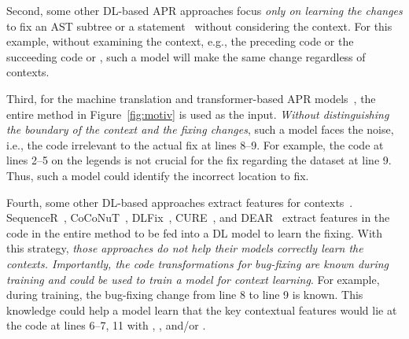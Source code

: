 Second, some other DL-based APR approaches focus {\em only
  on learning the changes} to fix an AST subtree or a
statement~\cite{chakrabortycodit,see2017get} without considering the
context. For this example, without examining the context,
e.g., the preceding code  or the succeeding code
 or ,
such a model will make the same change regardless of contexts.



Third, for the machine translation and transformer-based APR
models~\cite{hata2018learning,tufano2019learning,tufano2018empirical},
the entire method in Figure~\ref{fig:motiv} is used as the input. {\em
  Without distinguishing the boundary of the context and the fixing
  changes}, such a model faces the noise, i.e., the code irrelevant to
the actual fix at lines 8--9. For example, the code at lines 2--5 on
the legends is not crucial for the fix regarding the dataset at line
9. Thus, such a model could identify the incorrect location to fix.





Fourth, some other DL-based approaches extract features for
contexts~\cite{chen2018sequencer,cure-icse21,lutellier2020coconut,icse20,icse22}.
SequenceR~\cite{chen2018sequencer},
CoCoNuT~\cite{lutellier2020coconut}, DLFix~\cite{icse20},
CURE~\cite{cure-icse21}, and DEAR~\cite{icse22} extract features in
the code in the entire method to be fed into a DL model to
learn the fixing. With this strategy, {\em those approaches do not
  help their models correctly learn the contexts. Importantly, the code
  transformations for bug-fixing are known during training and could
  be used to train a model for context learning}. For example,
during training, the bug-fixing change from line 8 to line 9 is
known. This knowledge could help a model learn that the key contextual
features would lie at the code at lines 6--7, 11 with ,
, and/or .


